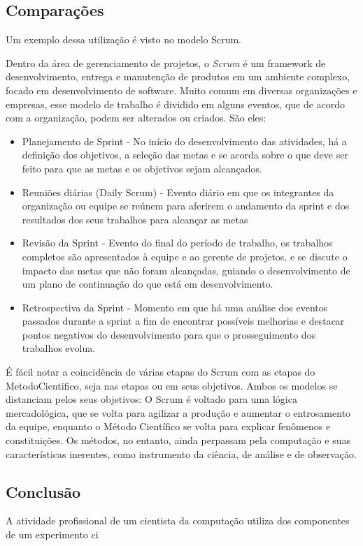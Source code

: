 \subsection{Comparações}
Um exemplo dessa utilização é visto no modelo Scrum.

Dentro da área de gerenciamento de projetos, o \textit{Scrum} é um framework de desenvolvimento, entrega e manutenção de produtos em um ambiente complexo, focado em desenvolvimento de software. Muito comum em diversas organizações e empresas, esse modelo de trabalho é dividido em alguns eventos, que de acordo com a organização, podem ser alterados ou criados. São eles:

\begin{itemize}
    \item Planejamento de Sprint - No início do desenvolvimento das atividades, há a definição dos objetivos, a seleção das metas e se acorda sobre o que deve ser feito para que as metas e os objetivos sejam alcançados.
    \item Reuniões diárias (Daily Scrum) - Evento diário em que os integrantes da organização ou equipe se reúnem para aferirem o andamento da sprint e dos resultados dos seus trabalhos para alcançar as metas
    \item Revisão da Sprint - Evento do final do período de trabalho, os trabalhos completos são apresentados à  equipe e ao gerente de projetos, e se discute o impacto das metas que não foram alcançadas, guiando o desenvolvimento de um plano de continuação do que está em desenvolvimento.
    \item Retrospectiva da Sprint - Momento em que há uma análise dos eventos passados durante a sprint a fim de encontrar possíveis melhorias e destacar pontos negativos do desenvolvimento para que o prosseguimento dos trabalhos evolua.
\end{itemize}

É fácil notar a coincidência de várias etapas do Scrum com as etapas do \gls{MetodoCientifico}, seja nas etapas ou em seus objetivos. Ambos os modelos se distanciam pelos seus objetivos: O Scrum é voltado para uma lógica mercadológica, que se volta para agilizar a produção e aumentar o entrosamento da equipe, enquanto o Método Científico se volta para explicar fenômenos e constituições. Os métodos, no entanto, ainda perpassam pela computação e suas características inerentes, como instrumento da ciência, de análise e de observação.

\subsection{Conclusão}
A atividade profissional de um cientista da computação utiliza dos componentes de um experimento ci